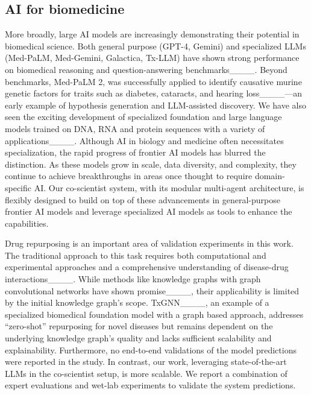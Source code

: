 \subsection{AI for biomedicine}
More broadly, large AI models are increasingly demonstrating their potential in biomedical science. Both general purpose (GPT-4, Gemini) and specialized LLMs (Med-PaLM, Med-Gemini, Galactica, Tx-LLM) have shown strong performance on biomedical reasoning and question-answering benchmarks____. Beyond benchmarks, Med-PaLM 2, was successfully applied to identify causative murine genetic factors for traits such as diabetes, cataracts, and hearing loss____---an early example of hypothesis generation and LLM-assisted discovery. We have also seen the exciting development of specialized foundation and large language models trained on DNA, RNA and protein sequences with a variety of applications____. Although AI in biology and medicine often necessitates specialization, the rapid progress of frontier AI models has blurred the distinction. As these models grow in scale, data diversity, and complexity, they continue to achieve breakthroughs in areas once thought to require domain-specific AI. Our co-scientist system, with its modular multi-agent architecture, is flexibly designed to build on top of these advancements in general-purpose frontier AI models and leverage specialized AI models as tools to enhance the capabilities.
 
Drug repurposing is an important area of validation experiments in this work. The traditional approach to this task requires both computational and experimental approaches and a comprehensive understanding of disease-drug interactions____. While methods like knowledge graphs with graph convolutional networks have shown promise____, their applicability is limited by the initial knowledge graph's scope.  TxGNN____, an example of a specialized biomedical foundation model with a graph based approach, addresses ``zero-shot'' repurposing for novel diseases but remains dependent on the underlying knowledge graph's quality and lacks sufficient scalability and explainability. Furthermore, no end-to-end validations of the model predictions were reported in the study. In contrast, our work, leveraging state-of-the-art LLMs in the co-scientist setup, is more scalable. We report a combination of expert evaluations and wet-lab experiments to validate the system predictions.



\clearpage
